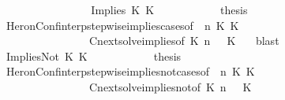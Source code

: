\begin{isabellebody}
\ \ \ \ \ \ \isamarkupfalse%
\isanewline
\ \ \ \ \ \ \ \ \isamarkupfalse%
\ {\isacharparenleft}Implies\ K{}\ K{}{\isacharparenright}\isanewline
\ \ \ \ \ \ \ \ \isamarkupfalse%
\ \isamarkupfalse%
\ {\isacharquery}thesis\isanewline
\ \ \ \ \ \ \ \ \ \ \isamarkupfalse%
\ HeronConf{\isacharunderscore}interp{\isacharunderscore}stepwise{\isacharunderscore}implies{\isacharunderscore}cases{\isacharbrackleft}of\ {\isacartoucheopen}{\isasymGamma}{\isacartoucheclose}\ {\isacartoucheopen}n{\isacartoucheclose}\ {\isacartoucheopen}K{}{\isacartoucheclose}\ {\isacartoucheopen}K{}{\isacartoucheclose}\ {\isacartoucheopen}{\isasymPsi}{\isacartoucheclose}\ {\isacartoucheopen}{\isasymPhi}{\isacartoucheclose}{\isacharbrackright}\isanewline
\ \ \ \ \ \ \ \ \ \ \ \ \ \ \ \ Cnext{\isacharunderscore}solve{\isacharunderscore}implies{\isacharbrackleft}of\ {\isacartoucheopen}K{}{\isacartoucheclose}\ {\isacartoucheopen}n{\isacartoucheclose}\ {\isacartoucheopen}{\isasymGamma}{\isacartoucheclose}\ {\isacartoucheopen}{\isasymPsi}{\isacartoucheclose}\ {\isacartoucheopen}K{}{\isacartoucheclose}\ {\isacartoucheopen}{\isasymPhi}{\isacartoucheclose}{\isacharbrackright}\ \isamarkupfalse%
\ blast\isanewline
\ \ \ \ \ \ \isamarkupfalse%
\isanewline
\ \ \ \ \ \ \ \ \isamarkupfalse%
\ {\isacharparenleft}ImpliesNot\ K{}\ K{}{\isacharparenright}\isanewline
\ \ \ \ \ \ \ \ \isamarkupfalse%
\ \isamarkupfalse%
\ {\isacharquery}thesis\isanewline
\ \ \ \ \ \ \ \ \ \ \isamarkupfalse%
\ HeronConf{\isacharunderscore}interp{\isacharunderscore}stepwise{\isacharunderscore}implies{\isacharunderscore}not{\isacharunderscore}cases{\isacharbrackleft}of\ {\isacartoucheopen}{\isasymGamma}{\isacartoucheclose}\ {\isacartoucheopen}n{\isacartoucheclose}\ {\isacartoucheopen}K{}{\isacartoucheclose}\ {\isacartoucheopen}K{}{\isacartoucheclose}\ {\isacartoucheopen}{\isasymPsi}{\isacartoucheclose}\ {\isacartoucheopen}{\isasymPhi}{\isacartoucheclose}{\isacharbrackright}\isanewline
\ \ \ \ \ \ \ \ \ \ \ \ \ \ \ \ Cnext{\isacharunderscore}solve{\isacharunderscore}implies{\isacharunderscore}not{\isacharbrackleft}of\ {\isacartoucheopen}K{}{\isacartoucheclose}\ {\isacartoucheopen}n{\isacartoucheclose}\ {\isacartoucheopen}{\isasymGamma}{\isacartoucheclose}\ {\isacartoucheopen}{\isasymPsi}{\isacartoucheclose}\ {\isacartoucheopen}K{}{\isacartoucheclose}\ {\isacartoucheopen}{\isasymPhi}{\isacartoucheclose}{\isacharbrackright}\ \isamarkupfalse%

\end{isabellebody}
